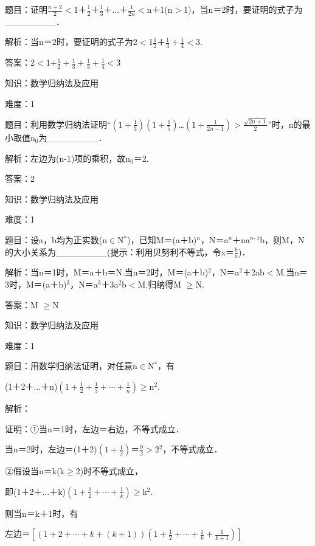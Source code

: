\documentclass{article} %
\begin{document}
 题目：证明$\frac{n+2}{2}\mathrm{<}$1＋$\frac{1}{2}$＋$\frac{1}{3}$＋{$\dots$}＋$\frac{1}{2n}\mathrm{<}$n＋1(n$\mathrm{>}$1)，当n＝2时，要证明的式子为\_\_\_\_\_\_\_\_．

 解析：当n＝2时，要证明的式子为2$\mathrm{<}$1$\frac{1}{2}$＋$\frac{1}{3}+\frac{1}{4}\mathrm{<}$3.

 答案：2$\mathrm{<}$1$+\frac{1}{2}+\frac{1}{3}+\frac{1}{3}+\frac{1}{4}\mathrm{<}$3



 知识：数学归纳法及应用

 难度：1

 题目：利用数学归纳法证明``$(1+\frac{1}{3})(1+\frac{1}{5})$\dots$(1+\frac{1}{2n-1})\mathrm{>}\frac{\sqrt{2n+1}}{2}$''时，n的最小取值n${}_{0}$为\_\_\_\_\_\_\_\_．

 解析：左边为(n-1)项的乘积，故n${}_{0}$＝2.

 答案：2

 

 知识：数学归纳法及应用

 难度：1

 题目：设a，b均为正实数(n$\mathrm{\in}$N${}^{*}$)，已知M＝(a＋b)${}^{n}$，N＝a${}^{n}$＋na${}^{n}$${}^{\textrm{-}}$${}^{1}$b，则M，N的大小关系为\_\_\_\_\_\_\_\_(提示：利用贝努利不等式，令x＝$\frac{b}{a}$)．

 解析：当n＝1时，M＝a＋b＝N.当n＝2时，M＝(a＋b)${}^{2}$，N＝a${}^{2}$＋2ab$\mathrm{<}$M.当n＝3时，M＝(a＋b)${}^{3}$，N＝a${}^{3}$＋3a${}^{2}$b$\mathrm{<}$M.归纳得M $\mathrm{\ge}$N.

 答案：M $\mathrm{\ge}$N

 

 知识：数学归纳法及应用

 难度：1

 题目：用数学归纳法证明，对任意n$\mathrm{\in}$N${}^{*}$，有

(1＋2＋{$\dots$}＋n)$(1+\frac{1}{2}+\frac{1}{3}+\cdots+\frac{1}{n})\mathrm{\ge}$n${}^{2}$.

 解析：

 证明：①当n＝1时，左边＝右边，不等式成立．

当n＝2时，左边＝(1＋2)$(1+\frac{1}{2})$＝$\frac{9}{2}\mathrm{>}$2${}^{2}$，不等式成立．

②假设当n＝k(k$\mathrm{\ge}$2)时不等式成立，

即(1＋2＋{$\dots$}＋k)$(1+\frac{1}{2}+\cdots+\frac{1}{k})\mathrm{\ge}$k${}^{2}$.

则当n＝k＋1时，有

左边＝$[(1+2+\cdots+k+(k+1))(1+\frac{1}{2}+\cdots+\frac{1}{k}+\frac{1}{k+1})]$
\end{document}
